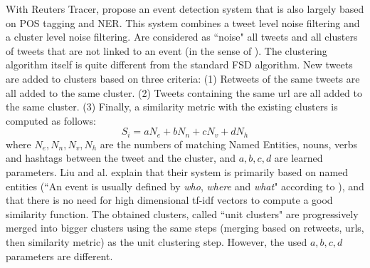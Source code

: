 With Reuters Tracer, \citet{liu_reuters_2016} propose an event detection system that is also largely based on POS tagging and NER. This system combines a tweet level noise filtering and a cluster level noise filtering. Are considered as ``noise" all tweets and all clusters of tweets that are not linked to an event (in the sense of \citet{mcminn_building_2013}). The clustering algorithm itself is quite different from the standard FSD algorithm. New tweets are added to clusters based on three criteria: (1) Retweets of the same tweets are all added to the same cluster. (2) Tweets containing the same url are all added to the same cluster. (3) Finally, a similarity metric with the existing clusters is computed as follows:
$$
S_i = aN_e + bN_n + cN_v + dN_h
$$
where $N_e,N_n,N_v,N_h$ are the numbers of matching Named Entities, nouns, verbs and hashtags between the tweet and the cluster, and $a, b, c, d$ are learned parameters. Liu and al. explain that their system is primarily based on named entities (``An event is usually defined by \textit{who}, \textit{where} and \textit{what}" according to \citet{mcminn_building_2013}), and that there is no need for high dimensional tf-idf vectors to compute a good similarity function. The obtained clusters, called ``unit clusters" are progressively merged into bigger clusters using the same steps (merging based on retweets, urls, then similarity metric) as the unit clustering step. However, the used $a, b, c, d$ parameters are different.

